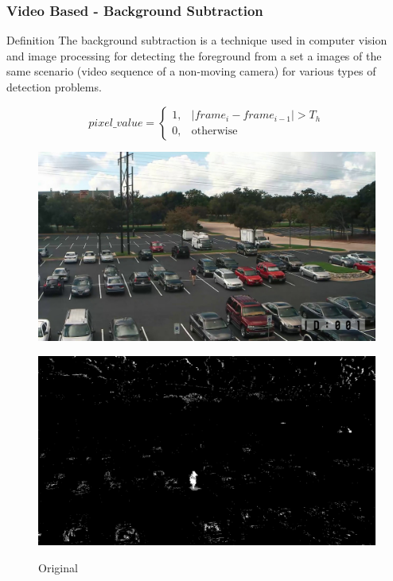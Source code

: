\documentclass{beamer}
\begin{document}
\begin{frame}[allowframebreaks]
\frametitle{Video Based - Background Subtraction}
\begin{block}{Definition}
The background subtraction is a technique used in computer vision and image processing for detecting the foreground from a set a images of the same scenario (video sequence of a non-moving camera) for various types of detection problems.

\[
pixel\_value= 
\begin{cases}
1,& |frame_i - frame_{i-1}| > T_h\\
0,              & \text{otherwise}
\end{cases}
\]
\end{block}
\vspace{5cm}
\begin{figure}[!htbp]
	\begin{minipage}[b]{0.48\textwidth}
		\href{run:Videos/original.mp4?autostart}{\includegraphics[width=\textwidth,keepaspectratio]{Pictures/frame255.jpg}}
		\caption{Original \vspace{4mm}}
		\label{foreground} 
	\end{minipage}
	\hfill
	\begin{minipage}[b]{0.48\textwidth}
		\href{run:Videos/bg.mp4?autostart}{\includegraphics[width=\textwidth,keepaspectratio]{Pictures/framebg255.jpg}}


\end{minipage}
\end{figure}
\end{frame}
\end{document}
